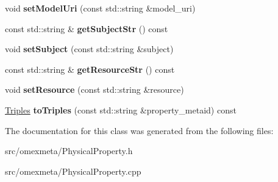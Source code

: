 \begin{DoxyCompactItemize}
void {\bfseries set\+Model\+Uri} (const std\+::string \&model\+\_\+uri)
\item 
\mbox{\label{classomexmeta_1_1PhysicalProperty_a4b9ad0a7fe22a3476d7e2f08834bbd74}} 
const std\+::string \& {\bfseries get\+Subject\+Str} () const
\item 
\mbox{\label{classomexmeta_1_1PhysicalProperty_a8bb7c912a21e0e318a9e16d2af1801e5}} 
void {\bfseries set\+Subject} (const std\+::string \&subject)
\item 
\mbox{\label{classomexmeta_1_1PhysicalProperty_a9177d21e829cbd872217ba6f9619d427}} 
const std\+::string \& {\bfseries get\+Resource\+Str} () const
\item 
\mbox{\label{classomexmeta_1_1PhysicalProperty_a420dab52a424d1be5a8610e19407980c}} 
void {\bfseries set\+Resource} (const std\+::string \&resource)
\item 
\mbox{\label{classomexmeta_1_1PhysicalProperty_a03056210a70ea8446b44de250646eeb5}} 
\hyperlink{classomexmeta_1_1Triples}{Triples} {\bfseries to\+Triples} (const std\+::string \&property\+\_\+metaid) const
\end{DoxyCompactItemize}


The documentation for this class was generated from the following files\+:\begin{DoxyCompactItemize}
\item 
src/omexmeta/Physical\+Property.\+h\item 
src/omexmeta/Physical\+Property.\+cpp\end{DoxyCompactItemize}

